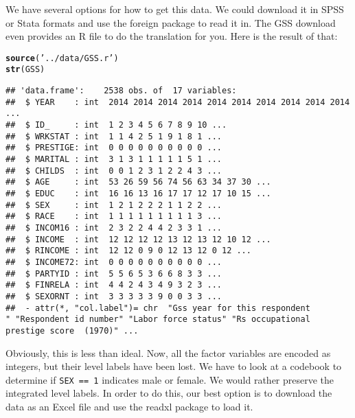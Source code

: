\documentclass[fleqn,10pt,lineno]{wlpeerj}\usepackage[]{graphicx}\usepackage[]{color}
\makeatletter
\newcommand{\hlstr}[1]{\textcolor[rgb]{0.192,0.494,0.8}{#1}}%
\newcommand{\hlstd}[1]{\textcolor[rgb]{0.345,0.345,0.345}{#1}}%
\newcommand{\hlkwd}[1]{\textcolor[rgb]{0.737,0.353,0.396}{\textbf{#1}}}%
\newenvironment{kframe}{%
 \def\at@end@of@kframe{}%
 \ifinner\ifhmode%
  \def\at@end@of@kframe{\end{minipage}}%
  \begin{minipage}{\columnwidth}%
 \fi\fi%
 \def\FrameCommand##1{\hskip\@totalleftmargin \hskip-\fboxsep
 \colorbox{shadecolor}{##1}\hskip-\fboxsep
     \hskip-\linewidth \hskip-\@totalleftmargin \hskip\columnwidth}%
 \MakeFramed {\advance\hsize-\width
   \@totalleftmargin\z@ \linewidth\hsize
   \@setminipage}}%
 {\par\unskip\endMakeFramed%
 \at@end@of@kframe}
\newenvironment{knitrout}{}{} %
\newcommand{\pkg}[1]{{\fontseries{b}\selectfont #1}}
\makeatother
\begin{document}
We have several options for how to get this data. We could download it in SPSS or Stata formats and use the foreign package to read it in. The GSS download even provides an R file to do the translation for you. Here is the result of that:

\begin{knitrout}\footnotesize
{}\color{fgcolor}\begin{kframe}
\begin{alltt}
\hlkwd{source}\hlstd{(}\hlstr{'../data/GSS.r'}\hlstd{)}
\hlkwd{str}\hlstd{(GSS)}
\end{alltt}
\begin{verbatim}
## 'data.frame':	2538 obs. of  17 variables:
##  $ YEAR    : int  2014 2014 2014 2014 2014 2014 2014 2014 2014 2014 ...
##  $ ID_     : int  1 2 3 4 5 6 7 8 9 10 ...
##  $ WRKSTAT : int  1 1 4 2 5 1 9 1 8 1 ...
##  $ PRESTIGE: int  0 0 0 0 0 0 0 0 0 0 ...
##  $ MARITAL : int  3 1 3 1 1 1 1 1 5 1 ...
##  $ CHILDS  : int  0 0 1 2 3 1 2 2 4 3 ...
##  $ AGE     : int  53 26 59 56 74 56 63 34 37 30 ...
##  $ EDUC    : int  16 16 13 16 17 17 12 17 10 15 ...
##  $ SEX     : int  1 2 1 2 2 2 1 1 2 2 ...
##  $ RACE    : int  1 1 1 1 1 1 1 1 1 3 ...
##  $ INCOM16 : int  2 3 2 2 4 4 2 3 3 1 ...
##  $ INCOME  : int  12 12 12 12 13 12 13 12 10 12 ...
##  $ RINCOME : int  12 12 0 9 0 12 13 12 0 12 ...
##  $ INCOME72: int  0 0 0 0 0 0 0 0 0 0 ...
##  $ PARTYID : int  5 5 6 5 3 6 6 8 3 3 ...
##  $ FINRELA : int  4 4 2 4 3 4 9 3 2 3 ...
##  $ SEXORNT : int  3 3 3 3 3 9 0 0 3 3 ...
##  - attr(*, "col.label")= chr  "Gss year for this respondent                       " "Respondent id number" "Labor force status" "Rs occupational prestige score  (1970)" ...
\end{verbatim}
\end{kframe}
\end{knitrout}




Obviously, this is less than ideal. Now, all the factor variables are encoded as integers, but their level labels have been lost. We have to look at a codebook to determine if \verb#SEX == 1# indicates male or female. We would rather preserve the integrated level labels. In order to do this, our best option is to download the data as an Excel file and use the \pkg{readxl} package to load it. 
\end{document}
